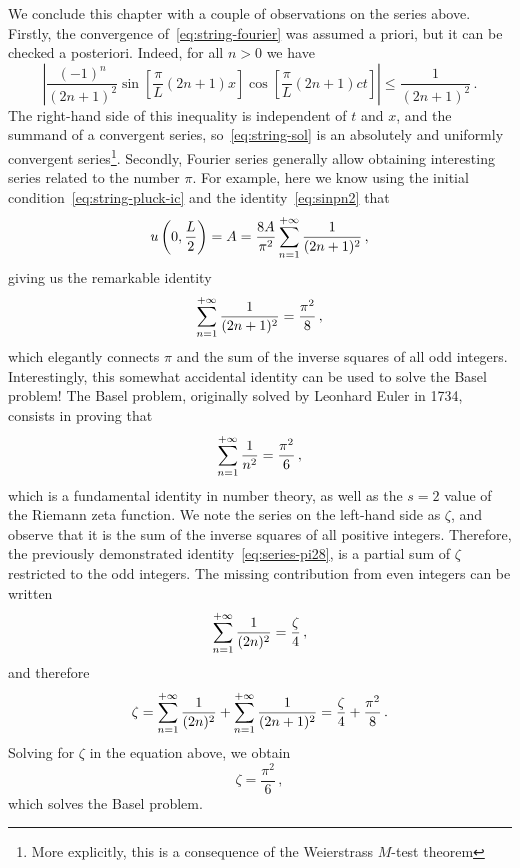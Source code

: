 We conclude this chapter with a couple of observations on the series above. Firstly, the
convergence of~\cref{eq:string-fourier} was assumed a priori, but it can be checked a
posteriori. Indeed, for all $n>0$ we have
\begin{equation}
  \left|\frac{(-1)^n}{(2n+1)^2}\sin\left[\frac{\pi}{L}(2n+1)x\right]
  \cos\left[\frac{\pi}{L}(2n+1)ct\right]\right|
  \leq\frac{1}{(2n+1)^2}\,.
\end{equation}
The right-hand side of this inequality is independent of $t$ and $x$, and the summand of a
convergent series, so~\cref{eq:string-sol} is an absolutely and uniformly convergent
series\footnote{More explicitly, this is a consequence of the Weierstrass $M$-test
theorem}. Secondly, Fourier series generally allow obtaining interesting series related to
the number $\pi$. For example, here we know using the initial
condition~\cref{eq:string-pluck-ic} and the identity~\cref{eq:sinpn2} that
\begin{equation}
  u\left(0,\frac{L}{2}\right)=A=\frac{8A}{\pi^2}\sum_{n=1}^{+\infty}\frac{1}{(2n+1)^2}\,,
\end{equation}
giving us the remarkable identity
\begin{equation}
  \sum_{n=1}^{+\infty}\frac{1}{(2n+1)^2}=\frac{\pi^2}{8}\,,
  \label{eq:series-pi28}
\end{equation}
which elegantly connects $\pi$ and the sum of the inverse squares of all odd integers.
Interestingly, this somewhat accidental identity can be used to solve the Basel problem!
The Basel problem, originally solved by Leonhard Euler in 1734, consists in proving that
\begin{equation}
  \sum_{n=1}^{+\infty}\frac{1}{n^2}=\frac{\pi^2}{6}\,,
\end{equation}
which is a fundamental identity in number theory, as well as the $s=2$ value of the
Riemann zeta function. We note the series on the left-hand side as $\zeta$, and observe
that it is the sum of the inverse squares of all positive integers. Therefore, the
previously demonstrated identity~\cref{eq:series-pi28}, is a partial sum of $\zeta$
restricted to the odd integers. The missing contribution from even integers can be written
\begin{equation}
  \sum_{n=1}^{+\infty}\frac{1}{(2n)^2}=\frac{\zeta}{4}\,,
\end{equation}
and therefore
\begin{equation}
  \zeta=\sum_{n=1}^{+\infty}\frac{1}{(2n)^2}+\sum_{n=1}^{+\infty}\frac{1}{(2n+1)^2}
  =\frac{\zeta}{4}+\frac{\pi^2}{8}\,.
\end{equation}
Solving for $\zeta$ in the equation above, we obtain
\begin{equation}
  \zeta=\frac{\pi^2}{6}\,,
\end{equation}
which solves the Basel problem.
